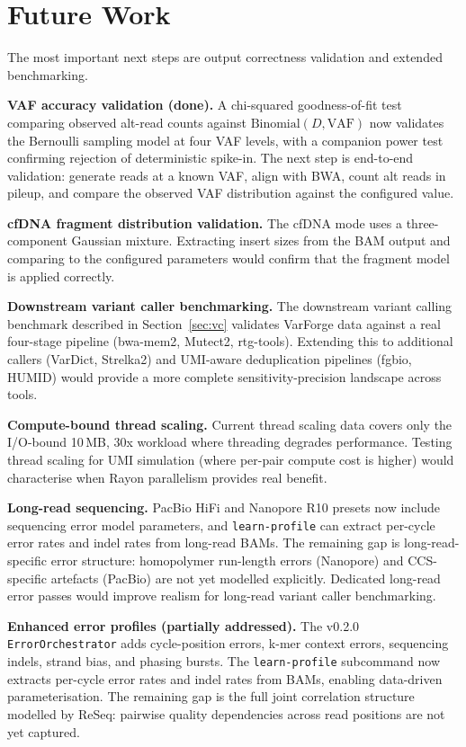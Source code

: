 \section{Future Work}
\label{sec:future}

The most important next steps are output correctness validation and extended benchmarking.

\textbf{VAF accuracy validation (done).}
A chi-squared goodness-of-fit test comparing observed alt-read counts against $\text{Binomial}(D, \text{VAF})$ now validates the Bernoulli sampling model at four VAF levels, with a companion power test confirming rejection of deterministic spike-in.
The next step is end-to-end validation: generate reads at a known VAF, align with BWA, count alt reads in pileup, and compare the observed VAF distribution against the configured value.

\textbf{cfDNA fragment distribution validation.}
The cfDNA mode uses a three-component Gaussian mixture.
Extracting insert sizes from the BAM output and comparing to the configured parameters would confirm that the fragment model is applied correctly.

\textbf{Downstream variant caller benchmarking.}
The downstream variant calling benchmark described in Section~\ref{sec:vc} validates VarForge data against a real four-stage pipeline (bwa-mem2, Mutect2, rtg-tools).
Extending this to additional callers (VarDict, Strelka2) and UMI-aware deduplication pipelines (fgbio, HUMID) would provide a more complete sensitivity-precision landscape across tools.

\textbf{Compute-bound thread scaling.}
Current thread scaling data covers only the I/O-bound 10\,MB, 30x workload where threading degrades performance.
Testing thread scaling for UMI simulation (where per-pair compute cost is higher) would characterise when Rayon parallelism provides real benefit.

\textbf{Long-read sequencing.}
PacBio HiFi and Nanopore R10 presets now include sequencing error model parameters, and \texttt{learn-profile} can extract per-cycle error rates and indel rates from long-read BAMs.
The remaining gap is long-read-specific error structure: homopolymer run-length errors (Nanopore) and CCS-specific artefacts (PacBio) are not yet modelled explicitly.
Dedicated long-read error passes would improve realism for long-read variant caller benchmarking.

\textbf{Enhanced error profiles (partially addressed).}
The v0.2.0 \texttt{ErrorOrchestrator} adds cycle-position errors, k-mer context errors, sequencing indels, strand bias, and phasing bursts.
The \texttt{learn-profile} subcommand now extracts per-cycle error rates and indel rates from BAMs, enabling data-driven parameterisation.
The remaining gap is the full joint correlation structure modelled by ReSeq\autocite{schmeing2021reseq}: pairwise quality dependencies across read positions are not yet captured.
